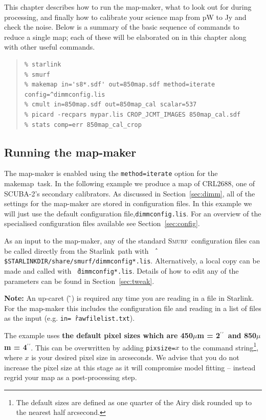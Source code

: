 \documentclass[twoside,11pt]{article}
\newcommand{\htmladdnormallink}[2]{#1}
\newcommand{\xref}[3]{#1}
\newcommand{\xlabel}[1]{}
\renewcommand{\_}{\texttt{\symbol{95}}}
\newcommand{\arcmin}{\mbox{$^\prime$}}
\newcommand{\arcsec}{\arcmin\hspace*{-0.1em}\arcmin}
\newenvironment{myquote}{\begin{quote}\begin{small}}{\end{small}\end{quote}}
\newcommand{\starlink}{\htmladdnormallink{Starlink}{http://starlink.jach.hawaii.edu}}
\newcommand{\smurf}{\xref{\textsc{Smurf}}{sun258}{}}
\newcommand{\task}[1]{\textsf{#1}}
\newcommand{\makemap}{\xref{\task{makemap}}{sun258}{MAKEMAP}}
\begin{document}
This chapter describes how to run the map-maker, what to look out for
during processing, and finally how to calibrate your science map from
pW to Jy and check the noise. Below is a summary of the basic sequence of
commands to reduce a single map; each of these will be elaborated on
in this chapter along with other useful commands.
\vspace{-1mm}
\begin{myquote}
\begin{verbatim}
% starlink
% smurf
% makemap in='s8*.sdf' out=850map.sdf method=iterate config=^dimmconfig.lis
% cmult in=850map.sdf out=850map_cal scalar=537
% picard -recpars mypar.lis CROP_JCMT_IMAGES 850map_cal.sdf
% stats comp=err 850map_cal_crop
\end{verbatim}
\end{myquote}


\subsection{\xlabel{running_dimm}Running the map-maker}

The map-maker is enabled using the \texttt{method=iterate} option for the
\makemap\ task. In the following example we produce a map of CRL2688,
one of SCUBA-2's secondary calibrators. As discussed in
Section~\ref{sec:dimm}, all of the settings for the map-maker are
stored in configuration files.  In this example we will just use the
default configuration file,\texttt{dimmconfig.lis}. For an overview of
the specialised configuration files available see
Section~\ref{sec:config}.

As an input to the map-maker, any of the standard \smurf\
configuration files can be called directly from the \starlink\ path
with \texttt{\^\,\$STARLINK\_DIR/share/smurf/dimmconfig*.lis}.
Alternatively, a local copy can be made and called with
\texttt{\^\,dimmconfig*.lis}. Details of how to edit any of the
parameters can be found in Section~\ref{sec:tweak}.

\textbf{Note:} An up-caret (\,\^\,) is required any time you are reading in
a file in \starlink. For the map-maker this includes the configuration
file and reading in a list of files as the input (e.g.
\texttt{in=\^\,rawfilelist.txt}).

The example uses \textbf{the
default pixel sizes which are 450$\mu$m = 2\arcsec\ and 850$\mu$m =
4\arcsec}. This can be overwritten by adding \texttt{pixsize=}$x$ to the
command string\footnote{The default sizes are defined as one quarter
of the Airy disk rounded up to the nearest half arcsecond.}, where $x$
is your desired pixel size in arcseconds. We advise that you do not
increase the pixel size at this stage as it will compromise model
fitting -- instead regrid your map as a post-processing step.
\end{document}
